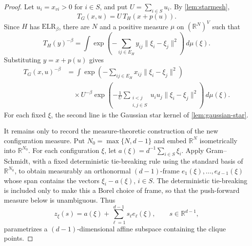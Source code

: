 \documentclass[preprint,12pt,authoryear]{elsarticle}
\numberwithin{equation}{section}
\theoremstyle{definition}
\theoremstyle{remark}
\newcommand{\R}{\mathbb{R}}
\newcommand{\1}{\mathbf{1}}
\newcommand{\ELR}{\mathrm{ELR}}
\begin{document}
\begin{proof}
Let \(u_i=x_{vi}>0\) for \(i\in S\), and put \(U=\sum_{i\in S}u_i\).  By \cref{lem:starmesh},
\begin{equation}
        T_G(x,u)=U\,T_H(x+p(u)).
\end{equation}
Since \(H\) has \(\ELR_\beta\), there are \(N\) and a positive measure \(\mu\) on \((\R^N)^V\) such that
\begin{equation}
        T_H(y)^{-\beta}
        =
        \int
        \exp\left(
        -\sum_{ij\in E_H}y_{ij}\|\xi_i-\xi_j\|^2
        \right)\,d\mu(\xi).
\end{equation}
Substituting \(y=x+p(u)\) gives
\begin{equation}
\begin{aligned}
        T_G(x,u)^{-\beta}
        &=
        \int
        \exp\left(
        -\sum_{ij\in E_H}x_{ij}\|\xi_i-\xi_j\|^2
        \right)  \\
        &\quad\times
        U^{-\beta}
        \exp\left(
        -\frac1U
        \sum_{\substack{i<j\\ i,j\in S}}
        u_i u_j\|\xi_i-\xi_j\|^2
        \right)\,d\mu(\xi).
\end{aligned}
\end{equation}
For each fixed \(\xi\), the second line is the Gaussian star kernel of \cref{lem:gaussian-star}.

It remains only to record the measure-theoretic construction of the new configuration measure.  Put \(N_0=\max\{N,d-1\}\) and embed \(\R^N\) isometrically into \(\R^{N_0}\).  For each configuration \(\xi\), let \(a(\xi)=d^{-1}\sum_{i\in S}\xi_i\).  Apply Gram--Schmidt, with a fixed deterministic tie-breaking rule using the standard basis of \(\R^{N_0}\), to obtain measurably an orthonormal \((d-1)\)-frame \(e_1(\xi),\ldots,e_{d-1}(\xi)\) whose span contains the vectors \(\xi_i-a(\xi)\), \(i\in S\).  The deterministic tie-breaking is included only to make this a Borel choice of frame, so that the push-forward measure below is unambiguous.  Thus
\begin{equation}
        z_{\xi}(s)
        =
        a(\xi)+\sum_{\ell=1}^{d-1}s_\ell e_\ell(\xi),
        \qquad s\in\R^{d-1},
\end{equation}
parametrizes a \((d-1)\)-dimensional affine subspace containing the clique points.


\end{proof}
\end{document}
